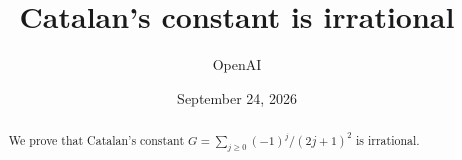 \documentclass[11pt]{article}
\title{Catalan's constant is irrational}
\author{OpenAI}
\date{September 24, 2026}
\theoremstyle{definition}
\theoremstyle{remark}
\begin{document}
\maketitle
\begin{abstract}
We prove that Catalan's constant
$G=\sum_{j\geq0}(-1)^j/(2j+1)^2$ is irrational.
\end{abstract}











\begingroup
\raggedright

\endgroup
\end{document}
